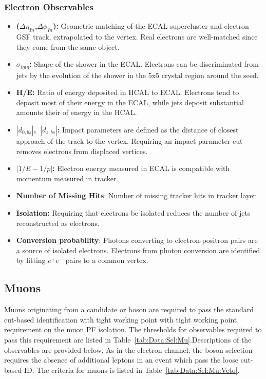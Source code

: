 \subsubsection{Electron Observables}
\begin{itemize}
    \item \textbf{($\Delta\eta_{In}$,$\Delta\phi_{In}$):} Geometric matching of the ECAL supercluster and electron GSF track, extrapolated to the vertex. Real electrons are well-matched since they come from the same object. 
    \item \textbf{$\sigma_{i\eta i\eta}$:} Shape of the shower in the ECAL. Electrons can be discriminated from jets by the evolution of the shower in the 5x5 crystal region around the seed.
    \item \textbf{H/E:} Ratio of energy deposited in HCAL to ECAL. Electrons tend to deposit most of their energy in the ECAL, while jets deposit substantial amounts their of energy in the HCAL.
    \item \textbf{$|d_{0,bs}|$,~$|d_{z,bs}|$:} Impact parameters are defined as the distance of closest approach of the track to the vertex. Requiring an impact parameter cut removes electrons from displaced vertices.
    \item \textbf{$|1/E-1/p|$:} Electron energy measured in ECAL is compatible with momentum measured in tracker.
    \item \textbf{Number of Missing Hits}: Number of missing tracker hits in tracker layer
    \item \textbf{Isolation:} Requiring that electrons be isolated reduces the number of jets reconstructed as electrons.
    \item \textbf{Conversion probability}: Photons converting to electron-positron pairs are a source of isolated electrons. Electrons from photon conversion are identified by fitting $e^+e^-$ pairs to a common vertex.
\end{itemize}




\subsection{Muons}\label{ch:IdIso:Mu}

Muons originating from a candidate \Wpm or \Z boson are required to pass the standard cut-based identification with tight working point with tight working point requirement on the muon PF isolation. The thresholds for observables required to pass this requirement are listed in Table~\ref{tab:Data:Sel:Mu}.Descriptions of the observables are provided below. As in the electron channel, the \Wpm boson selection requires the absence of additional leptons in an event which pass the loose cut-based ID. The criteria for muons is listed in Table~\ref{tab:Data:Sel:Mu:Veto}. 

